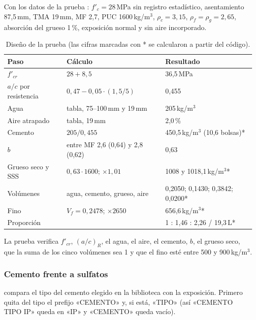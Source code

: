 Con los datos de la prueba : $f'_c = 28$\,MPa sin registro estadístico,
asentamiento 87,5\,mm, TMA 19\,mm, MF 2,7, PUC 1600\,kg/m$^3$, $\rho_c = 3{,}15$, $\rho_f = \rho_g = 2{,}65$, absorción
del grueso 1\,\%, exposición normal y sin aire incorporado.

\begin{table}[H]
	\centering
	\caption{Diseño de la prueba  (las cifras marcadas con * se calcularon a partir del código).}
	\label{tab:con-ejemplo-aci}
	\begin{tabular}{L{4.6cm}L{5.4cm}L{3.2cm}}
		\hline
		\textbf{Paso} & \textbf{Cálculo} & \textbf{Resultado} \\ \hline
		$f'_{cr}$ & $28 + 8{,}5$ & 36,5\,MPa \\
		$a/c$ por resistencia & $0{,}47 - 0{,}05 \cdot (1{,}5/5)$ & 0,455 \\
		Agua & tabla, 75--100\,mm y 19\,mm & 205\,kg/m$^3$ \\
		Aire atrapado & tabla, 19\,mm & 2,0\,\% \\
		Cemento & $205 / 0{,}455$ & 450,5\,kg/m$^3$ (10,6 bolsas)* \\
		$b$ & entre MF 2,6 (0,64) y 2,8 (0,62) & 0,63 \\
		Grueso seco y SSS & $0{,}63 \cdot 1600$; $\times 1{,}01$ & 1008 y 1018,1\,kg/m$^3$* \\
		Volúmenes & agua, cemento, grueso, aire & 0,2050; 0,1430; 0,3842; 0,0200* \\
		Fino & $V_f = 0{,}2478$; $\times 2650$ & 656,6\,kg/m$^3$* \\
		Proporción & & 1 : 1,46 : 2,26 / 19,3\,L* \\
		\hline
	\end{tabular}
\end{table}

La prueba verifica $f'_{cr}$, $(a/c)_R$, el agua, el aire, el cemento, $b$, el grueso seco, que la suma de los cinco
volúmenes sea 1 y que el fino esté entre 500 y 900\,kg/m$^3$.

\subsubsection{Cemento frente a sulfatos}

 compara el tipo del cemento elegido en la biblioteca con la
exposición. Primero quita del tipo el prefijo «CEMENTO» y, si está, «TIPO» (así «CEMENTO TIPO IP» queda en «IP» y
«CEMENTO» queda vacío).

